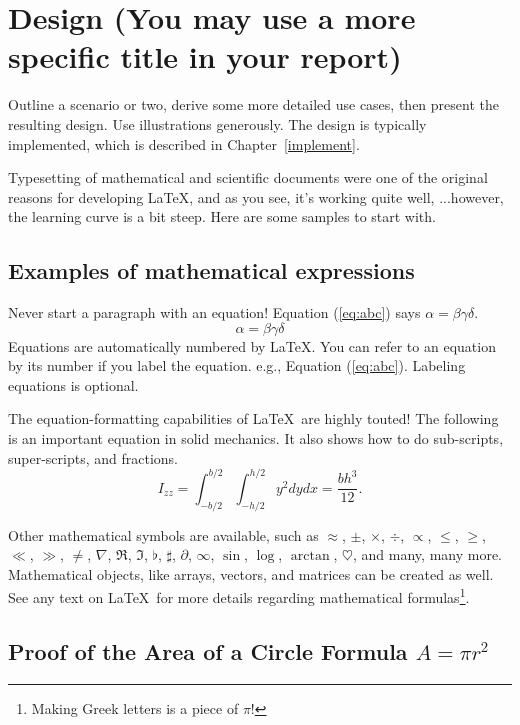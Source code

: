 \cleardoublepage
\chapter{Design (You may use a more specific title in your report)}
\label{design}  Outline a scenario or two, derive some more detailed
use cases, then present the resulting design. Use illustrations
generously. The design is typically implemented, which is described
in Chapter~\ref{implement}.

Typesetting of mathematical and scientific documents were one of the
original reasons for developing \LaTeX, and as you see, it's working
quite well, ...however, the learning curve is a bit steep. Here are
some samples to start with.

\section{ Examples of mathematical expressions }

Never start a paragraph with an equation! Equation (\ref{eq:abc})
says $ \alpha = \beta \gamma \delta $.
\begin{equation}
  \alpha = \beta \gamma \delta
  \label{eq:abc}
\end{equation}
Equations are automatically numbered by \LaTeX.  You can refer to an
equation by its number if you label the equation. e.g., Equation
(\ref{eq:abc}). Labeling equations is optional.

The equation-formatting capabilities of \LaTeX\  are highly touted!
The following is an important equation in solid mechanics. It also
shows how to do sub-scripts, super-scripts, and fractions.
\begin{equation}
  I_{zz} = \int_{-b/2}^{b/2} \int_{-h/2}^{h/2} y^2 dy dx = \frac{b h^3}{12}.
  \label{eq:mom-inert}
\end{equation}

Other mathematical symbols are available, such as $\approx$, $\pm$,
$\times$, $\div$, $\propto$, $\leq$, $\geq$, $\ll$, $\gg$, $\neq$,
$\nabla$, $\Re$, $\Im$, $\flat$, $\sharp$, $\partial$, $\infty$,
$\sin$, $\log$, $\arctan$, $\heartsuit$, and many, many more.
Mathematical objects, like arrays, vectors, and matrices can be
created as well. See any text on \LaTeX\  for more details regarding
mathematical formulas\footnote{Making Greek letters is a piece of
$\pi$!}.




\section{Proof of the Area of a Circle Formula $A = \pi r^2$}
\newtheorem{prf}{Theorem}


